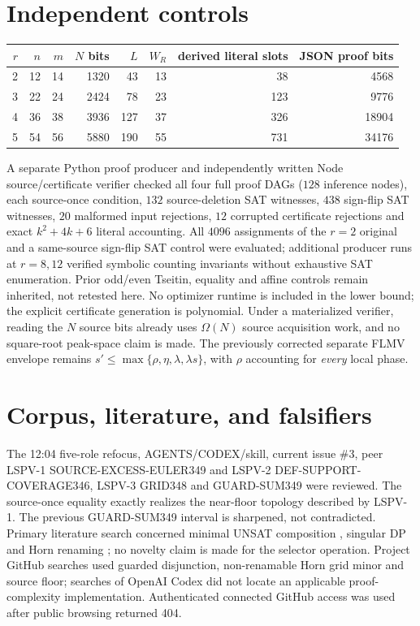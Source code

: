 \documentclass[11pt]{article}
\begin{document}
\section*{Independent controls}
\begin{center}
\begin{tabular}{rrrrrrrr}\toprule
$r$ & $n$&$m$&$N$ bits&$L$&$W_R$&derived literal slots&JSON proof bits\\\midrule
2&12&14&1320&43&13&38&4568\\
3&22&24&2424&78&23&123&9776\\
4&36&38&3936&127&37&326&18904\\
5&54&56&5880&190&55&731&34176\\\bottomrule
\end{tabular}
\end{center}
A separate Python proof producer and independently written Node source/certificate verifier checked all four full proof DAGs ($128$ inference nodes), each source-once condition, $132$ source-deletion SAT witnesses, $438$ sign-flip SAT witnesses, $20$ malformed input rejections, $12$ corrupted certificate rejections and exact $k^2+4k+6$ literal accounting. All $4096$ assignments of the $r=2$ original and a same-source sign-flip SAT control were evaluated; additional producer runs at $r=8,12$ verified symbolic counting invariants without exhaustive SAT enumeration. Prior odd/even Tseitin, equality and affine controls remain inherited, not retested here. No optimizer runtime is included in the lower bound; the explicit certificate generation is polynomial. Under a materialized verifier, reading the $N$ source bits already uses $\Omega(N)$ source acquisition work, and no square-root peak-space claim is made. The previously corrected separate FLMV envelope remains $s'\le\max\{\rho,\eta,\lambda,\lambda s\}$, with $\rho$ accounting for \emph{every} local phase.

\section*{Corpus, literature, and falsifiers}
The 12:04 five-role refocus, AGENTS/CODEX/skill, current issue \#3, peer LSPV-1 SOURCE-EXCESS-EULER349 and LSPV-2 DEF-SUPPORT-COVERAGE346, LSPV-3 GRID348 and GUARD-SUM349 were reviewed. The source-once equality exactly realizes the near-floor topology described by LSPV-1. The previous GUARD-SUM349 interval is sharpened, not contradicted. Primary literature search concerned minimal UNSAT composition \cite{Kullmann2011}, singular DP \cite{KullmannZhao2012} and Horn renaming \cite{Lewis1978}; no novelty claim is made for the selector operation. Project GitHub searches used guarded disjunction, non-renamable Horn grid minor and source floor; searches of OpenAI Codex did not locate an applicable proof-complexity implementation. Authenticated connected GitHub access was used after public browsing returned 404.
\end{document}
